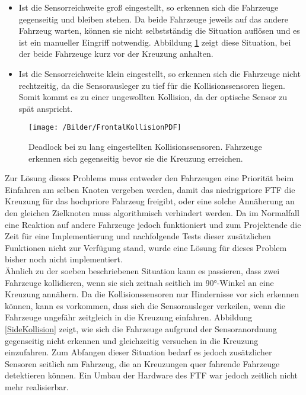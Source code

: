 		\begin{itemize}
			\item Ist die Sensorreichweite groß eingestellt, so erkennen sich die Fahrzeuge gegenseitig und bleiben stehen. Da beide Fahrzeuge jeweils auf das andere Fahrzeug warten, können sie nicht selbstständig die Situation auflösen und es ist ein manueller Eingriff notwendig. Abbildung \ref{FronalKollision} zeigt diese Situation, bei der beide Fahrzeuge kurz vor der Kreuzung anhalten.
			\item Ist die Sensorreichweite klein eingestellt, so erkennen sich die Fahrzeuge nicht rechtzeitig, da die Sensorausleger zu tief für die Kollisionssensoren liegen. Somit kommt es zu einer ungewollten Kollision, da der optische Sensor zu spät anspricht.
		\end{itemize}
		
		\begin{figure}[h]
			\centering
			\texttt{[image: /Bilder/FrontalKollisionPDF]}
			\vspace{0.2cm}
			\caption{Deadlock bei zu lang eingestellten Kollisionssensoren. Fahrzeuge erkennen sich gegenseitig bevor sie die Kreuzung erreichen.}\label{FronalKollision}
		\end{figure}
		
		Zur Lösung dieses Problems muss entweder den Fahrzeugen eine Priorität beim Einfahren am selben Knoten vergeben werden, damit das niedrigpriore \ac{FTF} die Kreuzung für das hochpriore Fahrzeug freigibt, oder eine solche Annäherung an den gleichen Zielknoten muss algorithmisch verhindert werden. Da im Normalfall eine Reaktion auf andere Fahrzeuge jedoch funktioniert und zum Projektende die Zeit für eine Implementierung und nachfolgende Tests dieser zusätzlichen Funktionen nicht zur Verfügung stand, wurde eine Lösung für dieses Problem bisher noch nicht implementiert.
		\\[4pt]
		Ähnlich zu der soeben beschriebenen Situation kann es passieren, dass zwei Fahrzeuge kollidieren, wenn sie sich zeitnah seitlich im 90°-Winkel an eine Kreuzung annähern. Da die Kollisionssensoren nur Hindernisse vor sich erkennen können, kann es vorkommen, dass sich die Sensorausleger verkeilen, wenn die Fahrzeuge ungefähr zeitgleich in die Kreuzung einfahren. Abbildung \ref{SideKollision} zeigt, wie sich die Fahrzeuge aufgrund der Sensoranordnung gegenseitig nicht erkennen und gleichzeitig versuchen in die Kreuzung einzufahren. Zum Abfangen dieser Situation bedarf es jedoch zusätzlicher Sensoren seitlich am Fahrzeug, die an Kreuzungen quer fahrende Fahrzeuge detektieren können. Ein Umbau der Hardware des \ac{FTF} war jedoch zeitlich nicht mehr realisierbar.
		
